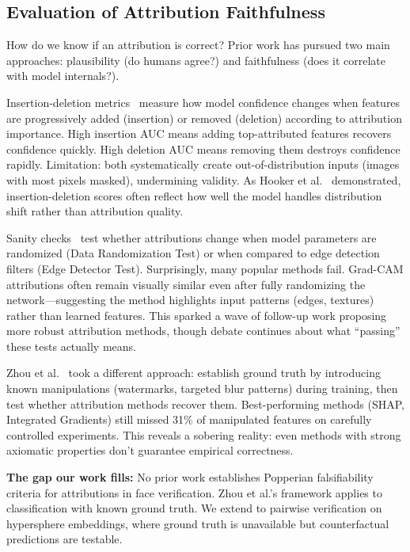 \subsection{Evaluation of Attribution Faithfulness}

How do we know if an attribution is correct? Prior work has pursued two main approaches: plausibility (do humans agree?) and faithfulness (does it correlate with model internals?).

Insertion-deletion metrics~\citep{petsiuk2018rise} measure how model confidence changes when features are progressively added (insertion) or removed (deletion) according to attribution importance. High insertion AUC means adding top-attributed features recovers confidence quickly. High deletion AUC means removing them destroys confidence rapidly. Limitation: both systematically create out-of-distribution inputs (images with most pixels masked), undermining validity. As Hooker et al.~\citep{hooker2019benchmark} demonstrated, insertion-deletion scores often reflect how well the model handles distribution shift rather than attribution quality.

Sanity checks~\citep{adebayo2018sanity} test whether attributions change when model parameters are randomized (Data Randomization Test) or when compared to edge detection filters (Edge Detector Test). Surprisingly, many popular methods fail. Grad-CAM attributions often remain visually similar even after fully randomizing the network—suggesting the method highlights input patterns (edges, textures) rather than learned features. This sparked a wave of follow-up work proposing more robust attribution methods, though debate continues about what ``passing'' these tests actually means.

Zhou et al.~\citep{zhou2022attribution} took a different approach: establish ground truth by introducing known manipulations (watermarks, targeted blur patterns) during training, then test whether attribution methods recover them. Best-performing methods (SHAP, Integrated Gradients) still missed 31\% of manipulated features on carefully controlled experiments. This reveals a sobering reality: even methods with strong axiomatic properties don't guarantee empirical correctness.

\textbf{The gap our work fills:} No prior work establishes Popperian falsifiability criteria for attributions in face verification. Zhou et al.'s framework applies to classification with known ground truth. We extend to pairwise verification on hypersphere embeddings, where ground truth is unavailable but counterfactual predictions are testable.

